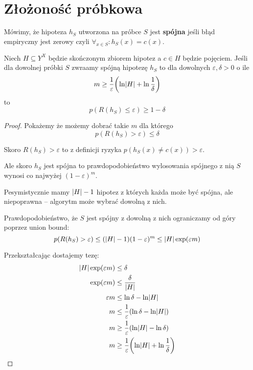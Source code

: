 \section{Złożoność próbkowa}

\begin{definition}
	Mówimy, że hipoteza \( h_S \) utworzona na próbce \( S \) jest \textbf{spójna} jeśli
	błąd empiryczny jest zerowy czyli \( \forall_{x \in S} : h_S(x) = c(x) \).
\end{definition}

\begin{theorem}
	Niech \( H \subseteq Y^X \) będzie skończonym zbiorem hipotez a \( c \in H \) będzie pojęciem. Jeśli dla dowolnej próbki \( S \) zwraamy spójną hipotezę \( h_S \) to dla dowolnych \( \varepsilon, \delta > 0 \) o ile
	\[
		m \geq \frac{1}{\varepsilon}\pars{\ln \card{H} + \ln \frac{1}{\delta}}
	\]
	to
	\[
		p(R(h_S) \leq \varepsilon) \geq 1 - \delta
	\]
\end{theorem}
\begin{proof}
	Pokażemy że możemy dobrać takie \( m \) dla którego
	\[
		p(R(h_S) > \varepsilon) \leq \delta
	\]

	Skoro \( R(h_S) > \varepsilon \) to z definicji ryzyka \( p(h_S(x) \neq c(x)) > \varepsilon \).

	Ale skoro \( h_S \) jest spójna to prawdopodobieństwo wylosowania spójnego z nią \( S \) wynosi co najwyżej \( (1 - \varepsilon)^m \).

	Pesymistycznie mamy \( \card{H} - 1 \) hipotez z których każda może być spójna, ale niepoprawna -- algorytm może wybrać dowolną z nich.

	Prawdopodobieństwo, że \( S \) jest spójny z dowolną z nich ograniczamy od góry poprzez union bound:
	\[
		p(R(h_S) > \varepsilon) \leq (\card{H} - 1) (1 - \varepsilon)^m \leq \card{H}\exp(\varepsilon m)
	\]

	Przekształcając dostajemy tezę:
	\begin{align*}
		\card{H}\exp(\varepsilon m) & \leq \delta                                                          \\
		\exp(\varepsilon m)         & \leq \frac{\delta}{\card{H}}                                         \\
		\varepsilon m               & \leq \ln \delta - \ln \card{H}                                       \\
		m                           & \leq \frac{1}{\varepsilon}\pars{\ln \delta - \ln \card{H}}           \\
		m                           & \geq \frac{1}{\varepsilon}\pars{\ln \card{H} - \ln \delta}           \\
		m                           & \geq \frac{1}{\varepsilon}\pars{\ln \card{H} + \ln \frac{1}{\delta}}
	\end{align*}
\end{proof}